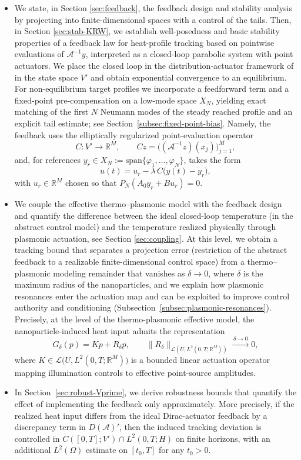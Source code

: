 \documentclass[11pt,a4paper]{article}
\numberwithin{equation}{section}
\theoremstyle{definition}
\newcommand{\R}{\mathbb{R}}
\newcommand{\1}{\mathbbm{1}}
\begin{document}
\begin{itemize}
\item[(ii)] We state, in Section \ref{sec:feedback}, the feedback design and stability analysis by projecting into finite-dimensional spaces with a control of the tails. Then, in Section \ref{sec:stab-KRW}, we establish well-posedness and basic stability properties of a
feedback law for heat-profile tracking based on pointwise evaluations of
$\mathcal A^{-1}y$, interpreted as a closed-loop parabolic system with point
actuators. We place the closed loop in the distribution-actuator framework of
\cite{KunRodWal24-cocv} in the state space $V'$ and obtain exponential
convergence to an equilibrium. For non-equilibrium target profiles we
incorporate a feedforward term and a fixed-point pre-compensation on a low-mode
space $X_N$, yielding exact matching of the first $N$ Neumann modes of the
steady reached profile and an explicit tail estimate; see
Section~\ref{subsec:fixed-point-bias}. Namely, the feedback uses the elliptically regularized point-evaluation operator
\[
C:V'\to\R^M,
\qquad
Cz=\big((\mathcal A^{-1}z)(x_j)\big)_{j=1}^M,
\]
and, for references $y_r\in X_N:=\mathrm{span}\{\varphi_1,\ldots,\varphi_N\}$, takes the form
\[
u(t)=u_r-\lambda\,C\big(y(t)-y_r\big),
\]
with $u_r\in\R^M$ chosen so that $P_N(A_0 y_r+Bu_r)=0$.


\item[(iii)] We couple the effective thermo--plasmonic model with the feedback
design and quantify the difference between the ideal closed-loop
temperature (in the abstract control model) and the temperature realized
physically through plasmonic actuation, see Section \ref{sec:coupling}. At this level, we obtain a tracking
bound that separates a projection error (restriction of the abstract feedback
to a realizable finite-dimensional control space) from a thermo--plasmonic
modeling remainder that vanishes as $\delta\to0$, where $\delta$ is the maximum radius of the nanoparticles, and we explain how plasmonic
resonances enter the actuation map and can be exploited to improve control
authority and conditioning (Subsection~\ref{subsec:plasmonic-resonances}). Precisely, at the level of the thermo-plasmonic effective model, the nanoparticle-induced heat input admits the representation
\[
G_\delta(p)=Kp+R_\delta p,
\qquad
\|R_\delta\|_{\mathcal L(U,L^2(0,T;\R^M))}\xrightarrow{\,\delta\to0\,}0,
\]
where $K\in\mathcal L\bigl(U,L^2(0,T;\R^M)\bigr)$ is a bounded linear actuation operator mapping illumination controls to effective point-source amplitudes.


\item[(iv)] In Section~\ref{sec:robust-Vprime}, we derive robustness bounds that quantify the effect of implementing the feedback only approximately. More precisely, if the realized heat input differs from the ideal Dirac-actuator feedback by a discrepancy term in $D(\mathcal A)'$, then the induced tracking deviation is controlled in $C([0,T];V')\cap L^2(0,T;H)$ on finite horizons, with an additional $L^2(\Omega)$ estimate on $[t_0,T]$ for any $t_0>0$.


\end{itemize}
\end{document}
